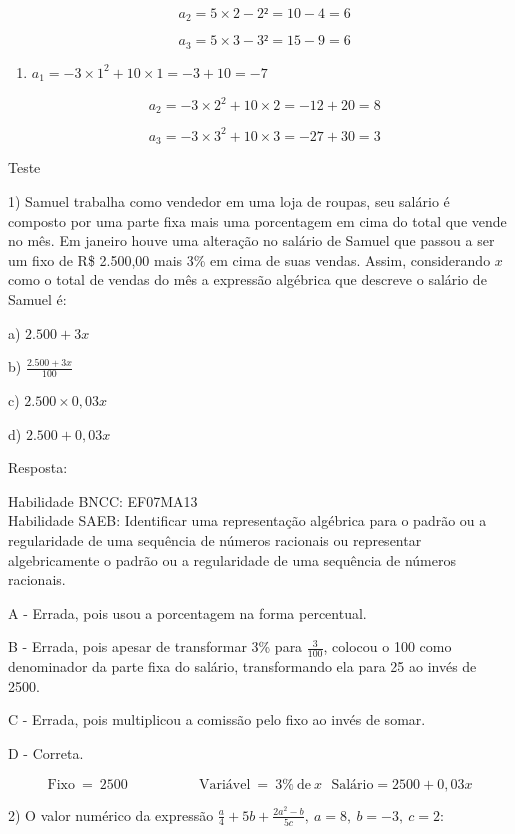 {{{{{{\[\text{\ \ \ \ \ }a_{2} = 5 \times 2 - 2² = 10 - 4 = 6\]

\[{\text{\ \ \ \ \ }a}_{3} = 5 \times 3 - 3² = 15 - 9 = 6\]

\begin{enumerate}
\def\labelenumi{\alph{enumi})}
\setcounter{enumi}{3}
\tightlist
\item
  \(a_{1} = - 3 \times 1^{2} + 10 \times 1 = - 3 + 10 = - 7\)
\end{enumerate}

\[\text{\ \ \ \ \ }a_{2} = - 3 \times 2^{2} + 10 \times 2 = - 12 + 20 = 8\]

\[{\text{\ \ \ \ \ }a}_{3} = - 3 \times 3^{2} + 10 \times 3 = - 27 + 30 = 3\]

Teste

1) Samuel trabalha como vendedor em uma loja de roupas, seu salário é
composto por uma parte fixa mais uma porcentagem em cima do total que
vende no mês. Em janeiro houve uma alteração no salário de Samuel que
passou a ser um fixo de R\$ 2.500,00 mais 3\% em cima de suas vendas.
Assim, considerando \(x\) como o total de vendas do mês a expressão
algébrica que descreve o salário de Samuel é:

a) \(2.500 + 3x\)

b) \(\frac{2.500 + 3x}{100}\)

c) \(2.500 \times 0,03x\)

d) \(2.500 + 0,03x\)

Resposta:

Habilidade BNCC: EF07MA13\\
Habilidade SAEB: Identificar uma representação algébrica para o padrão
ou a regularidade de uma sequência de números racionais ou representar
algebricamente o padrão ou a regularidade de uma sequência de números
racionais.

A - Errada, pois usou a porcentagem na forma percentual.

B - Errada, pois apesar de transformar 3\% para \(\frac{3}{100}\),
colocou o 100 como denominador da parte fixa do salário, transformando
ela para 25 ao invés de 2500.

C - Errada, pois multiplicou a comissão pelo fixo ao invés de somar.

D - Correta.

\[\text{Fixo}\  = \ 2500\ \ \ \ \ \ \ \ \ \ \ \ \ \ \ \ \ \ \ \ \ \ \ \text{Vari}á\text{vel}\  = \ 3\%\ \text{de}\ x\text{\ \ \ \ \ \ \ \ \ \ \ \ \ \ \ \ \ }\text{Sal}á\text{rio} = 2500 + 0,03x\]

2) O valor numérico da expressão
\(\frac{a}{4} + 5b + \frac{2a^{2} - b}{5c},\ a = 8,\ b = - 3,\ c = 2\):

}}}}}}
